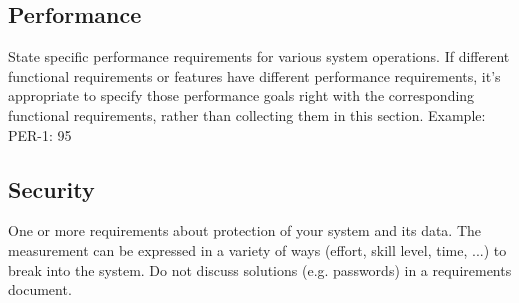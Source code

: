\subsection{Performance}
State specific performance requirements for various system operations. If different functional requirements or features have different performance requirements, it’s appropriate to specify those performance goals right with the corresponding functional requirements, rather than collecting them in this section. 
Example:\\

PER-1:	 95%

\subsection{Security }
One or more requirements about protection of your system and its data. The measurement can be expressed in a variety of ways (effort, skill level, time, ...) to break into the system.  Do not discuss solutions (e.g. passwords) in a requirements document.


